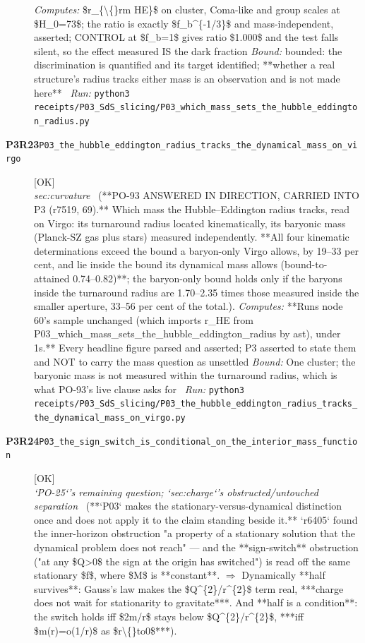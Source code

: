 \begin{description}
\emph{Computes:} \$r\_\{\textbackslash\{\}rm HE\}\$ on cluster, Coma-like and group scales at \$H\_0=73\$; the ratio is exactly \$f\_b\textasciicircum{}\{-1/3\}\$ and mass-independent, asserted; CONTROL at \$f\_b=1\$ gives ratio \$1.000\$ and the test falls silent, so the effect measured IS the dark fraction
 \emph{Bound:} bounded: the discrimination is quantified and its target identified; **whether a real structure's radius tracks either mass is an observation and is not made here**
\ \emph{Run:} \texttt{python3 receipts/P03\_SdS\_slicing/P03\_which\_mass\_sets\_the\_hubble\_eddington\_radius.py}
\item[\rcptlabel{P03_the_hubble_eddington_radius_tracks_the_dynamical_mass_on_virgo}{P3R23}\textbf{P3R23}\quad\texttt{P03\_the\_hubble\_eddington\_radius\_tracks\_the\_dynamical\_mass\_on\_virgo}]\hfill\textsf{[OK]}\\
\textit{sec:curvature} \ (**PO-93 ANSWERED IN DIRECTION, CARRIED INTO P3 (r7519, 69).** Which mass the Hubble--Eddington radius tracks, read on Virgo: its turnaround radius located kinematically, its baryonic mass (Planck-SZ gas plus stars) measured independently. **All four kinematic determinations exceed the bound a baryon-only Virgo allows, by 19--33 per cent, and lie inside the bound its dynamical mass allows (bound-to-attained 0.74--0.82)**; the baryon-only bound holds only if the baryons inside the turnaround radius are 1.70--2.35 times those measured inside the smaller aperture, 33--56 per cent of the total.). 
\emph{Computes:} **Runs node 60's sample unchanged (which imports r\_HE from P03\_which\_mass\_sets\_the\_hubble\_eddington\_radius by ast), under 1s.** Every headline figure parsed and asserted; P3 asserted to state them and NOT to carry the mass question as unsettled
 \emph{Bound:} One cluster; the baryonic mass is not measured within the turnaround radius, which is what PO-93's live clause asks for
\ \emph{Run:} \texttt{python3 receipts/P03\_SdS\_slicing/P03\_the\_hubble\_eddington\_radius\_tracks\_the\_dynamical\_mass\_on\_virgo.py}
\item[\rcptlabel{P03_the_sign_switch_is_conditional_on_the_interior_mass_function}{P3R24}\textbf{P3R24}\quad\texttt{P03\_the\_sign\_switch\_is\_conditional\_on\_the\_interior\_mass\_function}]\hfill\textsf{[OK]}\\
\textit{`PO-25`'s remaining question; `sec:charge`'s obstructed/untouched separation} \ (**`P03` makes the stationary-versus-dynamical distinction once and does not apply it to the claim standing beside it.** `r6405` found the inner-horizon obstruction "a property of a stationary solution that the dynamical problem does not reach" --- and the **sign-switch** obstruction ("at any \$Q>0\$ the sign at the origin has switched") is read off the same stationary \$f\$, where \$M\$ is **constant**. \ensuremath{\Rightarrow} Dynamically **half survives**: Gauss's law makes the \$Q\textasciicircum{}\{2\}/r\textasciicircum{}\{2\}\$ term real, ***charge does not wait for stationarity to gravitate***. And **half is a condition**: the switch holds iff \$2m/r\$ stays below \$Q\textasciicircum{}\{2\}/r\textasciicircum{}\{2\}\$, ***iff \$m(r)=o(1/r)\$ as \$r\textbackslash\{\}to0\$***). 

\end{description}

